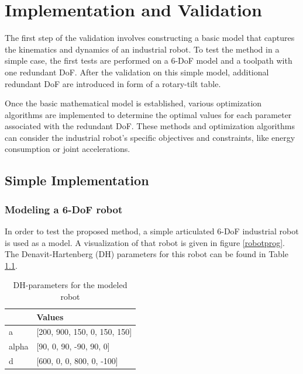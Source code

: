 \chapter{Implementation and Validation}%

The first step of the validation involves constructing a basic model that captures the kinematics and dynamics of an industrial robot. To test the method in a simple case, the first tests are performed on a 6-DoF model and a toolpath with one redundant DoF. After the validation on this simple model, additional redundant DoF are introduced in form of a rotary-tilt table. 

Once the basic mathematical model is established, various optimization algorithms are implemented to determine the optimal values for each parameter associated with the redundant DoF. These methods and optimization algorithms can consider the industrial robot's specific objectives and constraints, like energy consumption or joint accelerations. 



\section{Simple Implementation}%
\subsection{Modeling a 6-DoF robot}
In order to test the proposed method, a simple articulated 6-DoF industrial robot is used as a model. A visualization of that robot is given in figure \ref{robotprog}. The Denavit-Hartenberg (DH) parameters for this robot can be found in Table \ref{DH}.

\begin{table}[H]
	\centering
	\begin{tabular}{||l|l||}
		  & Values \\
		\hline
		\hline
		\hline
		a	&		[200, 900, 150,   0, 150,  150] \\
		alpha	&  	[90,    0,  90, -90,  90,    0] \\
		d	& 		[600,   0,   0, 800,   0, -100]\\
		
		\hline
		\hline
	\end{tabular}
	
	\caption{DH-parameters for the modeled robot}
	\label{DH}
\end{table}

